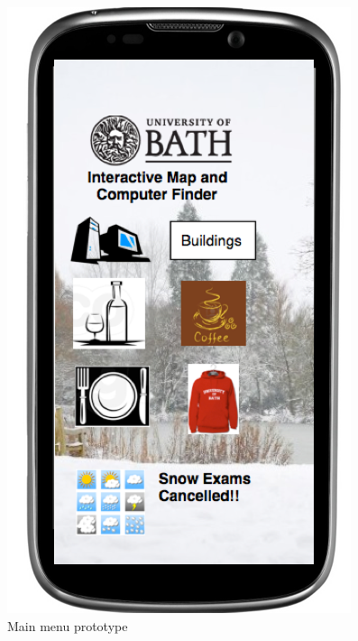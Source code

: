 \documentclass[10pt,a4paper,oneside]{report}
\begin{document}
\begin{figure}[H]
 \centering
 \includegraphics[keepaspectratio, scale=0.4]{prototype.png}
 \caption{Main menu prototype}
\end{figure}
\end{document}
